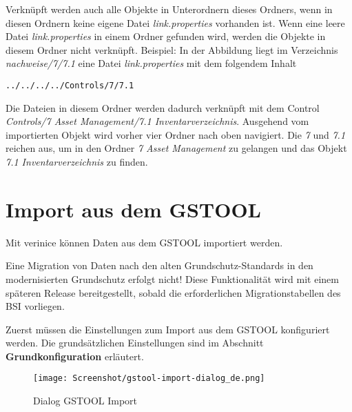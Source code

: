 \documentclass[a4paper,10pt]{book}
\begin{document}
Verknüpft werden auch alle Objekte in Unterordnern dieses Ordners, wenn in diesen Ordnern
keine eigene Datei \textit{link.properties} vorhanden ist. Wenn eine leere Datei \textit{link.properties} in einem
Ordner gefunden wird, werden die Objekte in diesem Ordner nicht verknüpft.
Beispiel:
In der Abbildung liegt im Verzeichnis \textit{nachweise/7/7.1} eine Datei \textit{link.properties} mit dem folgendem Inhalt
\begin{verbatim}
../../../../Controls/7/7.1
\end{verbatim}
Die Dateien in diesem Ordner werden dadurch verknüpft mit dem Control \textit{Controls/7 Asset Management/7.1 Inventarverzeichnis}. Ausgehend vom importierten Objekt wird vorher vier Ordner nach oben navigiert. Die \textit{7} und \textit{7.1} reichen aus, um in den Ordner \textit{7 Asset Management} zu gelangen und das Objekt \textit{7.1 Inventarverzeichnis} zu finden.

\section{Import aus dem GSTOOL} \label{Import aus dem GSTOOL}
Mit verinice können Daten aus dem \textsc{GSTOOL} importiert werden.

Eine Migration von Daten nach den alten Grundschutz-Standards in den
modernisierten Grundschutz erfolgt nicht! Diese Funktionalität wird mit einem
späteren Release bereitgestellt, sobald die erforderlichen Migrationstabellen
des BSI vorliegen.

Zuerst müssen die Einstellungen zum Import aus dem \textsc{GSTOOL} konfiguriert werden. Die grund\-sätzlichen Einstellungen sind im Abschnitt \textbf{Grundkonfiguration} erläutert.

\begin{figure}[htb!]
  \centering
  \texttt{[image: Screenshot/gstool-import-dialog\_de.png]}
  \caption{\label{Dialog GSTOOL Import} Dialog GSTOOL Import}
\end{figure}
\end{document}

